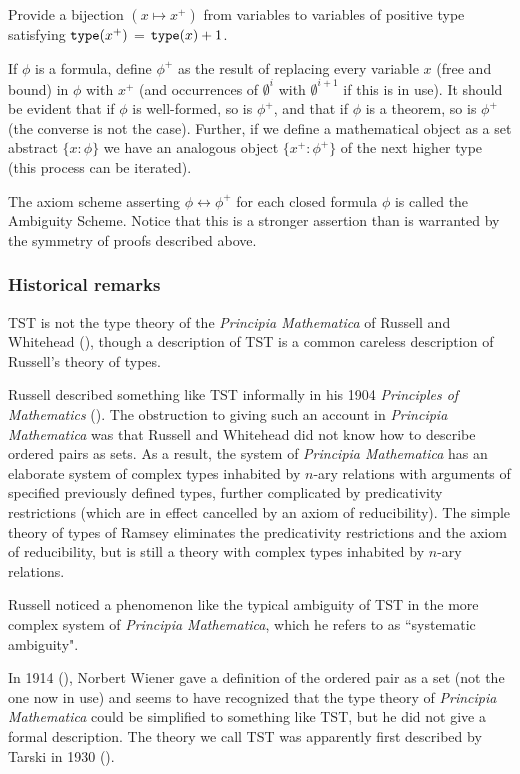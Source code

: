\documentclass[112pt]{article}
\begin{document}
Provide a bijection $(x \mapsto x^+)$ from variables to variables of positive type satisfying   ${\tt type}(x^+)$ = ${\tt type}(x)+1$.

If $\phi$ is a formula, define $\phi^+$ as the result of replacing every variable $x$ (free and bound) in $\phi$ with $x^+$ (and occurrences of $\emptyset^i$ with $\emptyset^{i+1}$ if this is in use).   It should be evident that if $\phi$ is well-formed, so is $\phi^+$,
and that if $\phi$ is a theorem, so is $\phi^+$ (the converse is not the case).  Further, if we define a mathematical object as a set abstract $\{x:\phi\}$ we have an analogous
object $\{x^+:\phi^+\}$ of the next higher type (this process can be iterated).

The axiom scheme asserting $\phi \leftrightarrow \phi^+$ for each closed formula $\phi$ is called the Ambiguity Scheme.   Notice that this is a stronger assertion than is warranted by the symmetry of proofs described above.

\subsubsection{Historical remarks}

TST is not the type theory of the {\em Principia Mathematica\/} of Russell and Whitehead (\cite{pm}), though a description of TST is a common careless description of Russell's theory of types.

Russell described something like TST informally in his 1904 {\em Principles of Mathematics\/} (\cite{pm1}).  The obstruction to giving such an account in {\em Principia Mathematica\/} was that
Russell and Whitehead did not know how to describe ordered pairs as sets.  As a result, the system of {\em Principia Mathematica\/} has an elaborate system of  complex
types inhabited by $n$-ary relations with arguments of specified previously defined types, further complicated by predicativity restrictions (which are in effect cancelled by an axiom of reducibility).
The simple theory of types of Ramsey eliminates the predicativity restrictions and the axiom of reducibility, but is still a theory with complex types inhabited by $n$-ary relations.

Russell noticed a phenomenon like the typical ambiguity of TST in the more complex system of {\em Principia Mathematica\/}, which he refers to as ``systematic ambiguity".

In 1914 (\cite{wiener}), Norbert Wiener gave a definition of the ordered pair as a set (not the one now in use) and seems to have recognized that the type theory of {\em Principia Mathematica\/} could be simplified to something like TST, but he did not give a formal description.  The theory we call TST was apparently first described by Tarski in 1930 (\cite{tarskiontst}).
\end{document}
